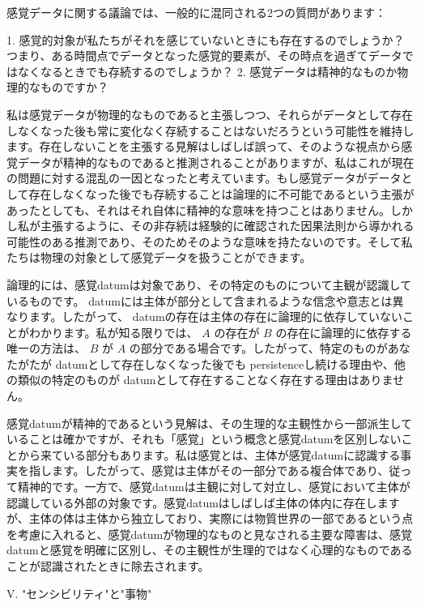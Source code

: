 \documentclass[a4paper,11pt,openany]{ltjsbook}
\begin{document}
感覚データに関する議論では、一般的に混同される2つの質問があります：

1. 感覚的対象が私たちがそれを感じていないときにも存在するのでしょうか？つまり、ある時間点でデータとなった感覚的要素が、その時点を過ぎてデータではなくなるときでも存続するのでしょうか？
2. 感覚データは精神的なものか物理的なものですか？

私は感覚データが物理的なものであると主張しつつ、それらがデータとして存在しなくなった後も常に変化なく存続することはないだろうという可能性を維持します。存在しないことを主張する見解はしばしば誤って、そのような視点から感覚データが精神的なものであると推測されることがありますが、私はこれが現在の問題に対する混乱の一因となったと考えています。もし感覚データがデータとして存在しなくなった後でも存続することは論理的に不可能であるという主張があったとしても、それはそれ自体に精神的な意味を持つことはありません。しかし私が主張するように、その非存続は経験的に確認された因果法則から導かれる可能性のある推測であり、そのためそのような意味を持たないのです。そして私たちは物理の対象として感覚データを扱うことができます。

論理的には、感覚datumは対象であり、その特定のものについて主観が認識しているものです。 datumには主体が部分として含まれるような信念や意志とは異なります。したがって、 datumの存在は主体の存在に論理的に依存していないことがわかります。私が知る限りでは、 $A$ の存在が $B$ の存在に論理的に依存する唯一の方法は、 $B$ が $A$ の部分である場合です。したがって、特定のものがあなたがたが datumとして存在しなくなった後でも persistenceし続ける理由や、他の類似の特定のものが datumとして存在することなく存在する理由はありません。

感覚datumが精神的であるという見解は、その生理的な主観性から一部派生していることは確かですが、それも「感覚」という概念と感覚datumを区別しないことから来ている部分もあります。私は感覚とは、主体が感覚datumに認識する事実を指します。したがって、感覚は主体がその一部分である複合体であり、従って精神的です。一方で、感覚datumは主観に対して対立し、感覚において主体が認識している外部の対象です。感覚datumはしばしば主体の体内に存在しますが、主体の体は主体から独立しており、実際には物質世界の一部であるという点を考慮に入れると、感覚datumが物理的なものと見なされる主要な障害は、感覚datumと感覚を明確に区別し、その主観性が生理的ではなく心理的なものであることが認識されたときに除去されます。

V. "センシビリティ"と"事物"
\end{document}
